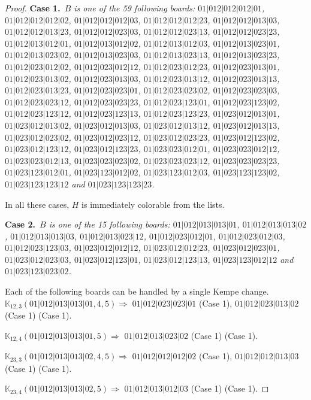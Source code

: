 \documentclass[12pt]{article}
\newcommand{\K}{\mathbb{K}}
\newcommand{\case}[2]{{\bf Case #1.}~{\it #2}~~}
\begin{document}
\begin{proof}
\bigskip
\case{1}{$B$ is one of the 59 following boards:
 $01|012|012|012|01$, $01|012|012|012|02$, $01|012|012|012|03$, $01|012|012|012|23$, $01|012|012|013|03$, $01|012|012|013|23$, $01|012|012|023|03$, $01|012|012|023|13$, $01|012|012|023|23$, $01|012|013|012|01$, $01|012|013|012|02$, $01|012|013|012|03$, $01|012|013|023|01$, $01|012|013|023|02$, $01|012|013|023|03$, $01|012|013|023|13$, $01|012|013|023|23$, $01|012|023|012|02$, $01|012|023|012|12$, $01|012|023|012|23$, $01|012|023|013|01$, $01|012|023|013|02$, $01|012|023|013|03$, $01|012|023|013|12$, $01|012|023|013|13$, $01|012|023|013|23$, $01|012|023|023|01$, $01|012|023|023|02$, $01|012|023|023|03$, $01|012|023|023|12$, $01|012|023|023|23$, $01|012|023|123|01$, $01|012|023|123|02$, $01|012|023|123|12$, $01|012|023|123|13$, $01|012|023|123|23$, $01|023|012|013|01$, $01|023|012|013|02$, $01|023|012|013|03$, $01|023|012|013|12$, $01|023|012|013|13$, $01|023|012|023|02$, $01|023|012|023|12$, $01|023|012|023|23$, $01|023|012|123|02$, $01|023|012|123|12$, $01|023|012|123|23$, $01|023|023|012|01$, $01|023|023|012|12$, $01|023|023|012|13$, $01|023|023|023|02$, $01|023|023|023|12$, $01|023|023|023|23$, $01|023|123|012|01$, $01|023|123|012|02$, $01|023|123|012|03$, $01|023|123|123|02$, $01|023|123|123|12$ and $01|023|123|123|23$.}

\bigskip

In all these cases, $H$ is immediately colorable from the lists.

\bigskip
\case{2}{$B$ is one of the 15 following boards:
 $01|012|013|013|01$, $01|012|013|013|02$, $01|012|013|013|03$, $01|012|013|023|12$, $01|012|023|012|01$, $01|012|023|012|03$, $01|012|023|123|03$, $01|023|012|012|12$, $01|023|012|012|23$, $01|023|012|023|01$, $01|023|012|023|03$, $01|023|012|123|01$, $01|023|012|123|13$, $01|023|123|012|12$ and $01|023|123|023|02$.}

\bigskip

\bigskip

Each of the following boards can be handled by a single Kempe change.
$\K_{12,3}(01|012|013|013|01,4, 5)\Rightarrow $ $01|012|023|023|01$ (Case 1), $01|012|023|013|02$ (Case 1) (Case 1).

$\K_{12,4}(01|012|013|013|01,5)\Rightarrow $ $01|012|013|023|02$ (Case 1) (Case 1).


\bigskip

$\K_{23,3}(01|012|013|013|02,4, 5)\Rightarrow $ $01|012|012|012|02$ (Case 1), $01|012|012|013|03$ (Case 1) (Case 1).

$\K_{23,4}(01|012|013|013|02,5)\Rightarrow $ $01|012|013|012|03$ (Case 1) (Case 1).



\end{proof}
\end{document}
